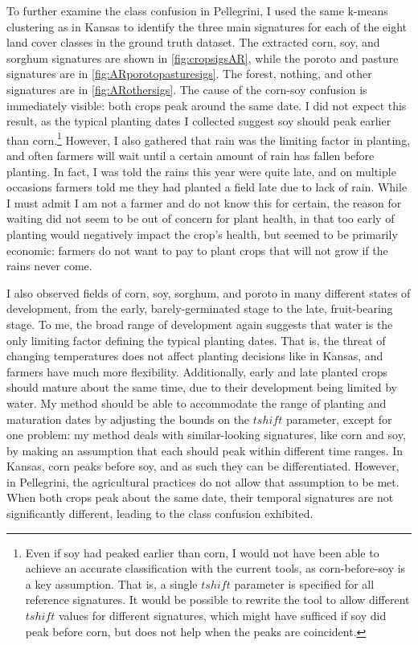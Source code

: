 To further examine the class confusion in Pellegrini, I used the same k-means clustering as in Kansas to identify the three main signatures for each of the eight land cover classes in the ground truth dataset. The extracted corn, soy, and sorghum signatures are shown in \autoref{fig:cropsigsAR}, while the poroto and pasture signatures are in \autoref{fig:ARporotopasturesigs}. The forest, nothing, and other signatures are in \autoref{fig:ARothersigs}. The cause of the corn-soy confusion is immediately visible: both crops peak around the same date. I did not expect this result, as the typical planting dates I collected suggest soy should peak earlier than corn.\footnote{Even if soy had peaked earlier than corn, I would not have been able to achieve an accurate classification with the current tools, as corn-before-soy is a key assumption. That is, a single $tshift$ parameter is specified for all reference signatures. It would be possible to rewrite the tool to allow different $tshift$ values for different signatures, which might have sufficed if soy did peak before corn, but does not help when the peaks are coincident.} However, I also gathered that rain was the limiting factor in planting, and often farmers will wait until a certain amount of rain has fallen before planting. In fact, I was told the rains this year were quite late, and on multiple occasions farmers told me they had planted a field late due to lack of rain. While I must admit I am not a farmer and do not know this for certain, the reason for waiting did not seem to be out of concern for plant health, in that too early of planting would negatively impact the crop's health, but seemed to be primarily economic: farmers do not want to pay to plant crops that will not grow if the rains never come.

I also observed fields of corn, soy, sorghum, and poroto in many different states of development, from the early, barely-germinated stage to the late, fruit-bearing stage. To me, the broad range of development again suggests that water is the only limiting factor defining the typical planting dates. That is, the threat of changing temperatures does not affect planting decisions like in Kansas, and farmers have much more flexibility. Additionally, early and late planted crops should mature about the same time, due to their development being limited by water. My method should be able to accommodate the range of planting and maturation dates by adjusting the bounds on the $tshift$ parameter, except for one problem: my method deals with similar-looking signatures, like corn and soy, by making an assumption that each should peak within different time ranges. In Kansas, corn peaks before soy, and as such they can be differentiated. However, in Pellegrini, the agricultural practices do not allow that assumption to be met. When both crops peak about the same date, their temporal signatures are not significantly different, leading to the class confusion exhibited.

